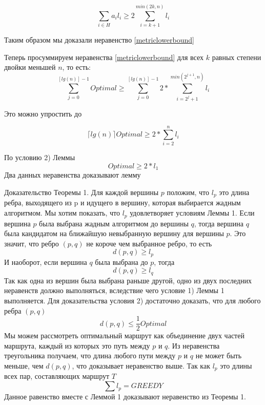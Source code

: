 \documentclass[a4paper, 14pt]{extarticle}
\begin{document}
\begin{equation}
	\sum_{i \in H} a_i l_i \geq 2 \sum_{i=k+1}^{min(2k, n)} l_i
	\label{sum}
\end{equation}

Таким образом мы доказали неравенство \eqref{metriclowerbound}

Теперь просуммируем неравенства \eqref{metriclowerbound} для всех $k$ равных степени двойки меньшей $n$, то есть:
\begin{equation}
\sum_{j=0}^{[lg(n)]-1} Optimal \geq \sum_{j=0}^{[lg(n)]-1} 2* \sum_{i=2^j+1}^{min(2^{j+1}, n)} l_i
\end{equation}

Это можно упростить до

\begin{equation}
\lceil lg(n) \rceil Optimal \geq 2* \sum_{i=2}^{n} l_i
\end{equation}

По условию 2) Леммы
\begin{equation}
Optimal \geq 2*l_1
\end{equation}
Два данных неравенства доказывают лемму

Доказательство Теоремы 1. Для каждой  вершины $p$ положим, что $l_p$ это длина ребра, выходящего из p и идущего в вершину, которая выбирается жадным алгоритмом. Мы хотим показать, что $l_p$ удовлетворяет условиям Леммы 1. Если вершина $p$ была выбрана жадным алгоритмом до вершины $q$, тогда вершина $q$ была кандидатом на ближайшую невыбранную вершину для вершины $p$. Это значит, что ребро $(p,q)$ не короче чем выбранное ребро, то есть
\begin{equation}
d(p,q) \geq l_p
\end{equation}
И наоборот, если вершина $q$ была выбрана до $p$, тогда
\begin{equation}
d(p,q) \geq l_q
\end{equation}
Так как одна из вершин была выбрана раньше другой, одно из двух последних неравенств должно выполняться, вследствие чего  условие 1) Леммы 1 выполняется. Для доказательства условия 2) достаточно доказать, что для любого ребра $(p,q)$
\begin{equation}
d(p,q) \leq \frac{1}{2}Optimal
\end{equation}
Мы можем рассмотреть оптимальный маршрут как объединение двух частей маршрута, каждый из которых это путь между $p$ и $q$. Из неравенства треугольника получаем, что длина любого пути между $p$ и $q$ не может быть меньше, чем $d(p,q)$, что доказывает неравенство выше. Так как $l_p$ это длины всех пар, составляющих маршрут $T$
\begin{equation}
\sum l_p = GREEDY
\end{equation}
Данное равенство вместе с Леммой 1 доказывают неравенство из Теоремы 1.\\
\end{document}
